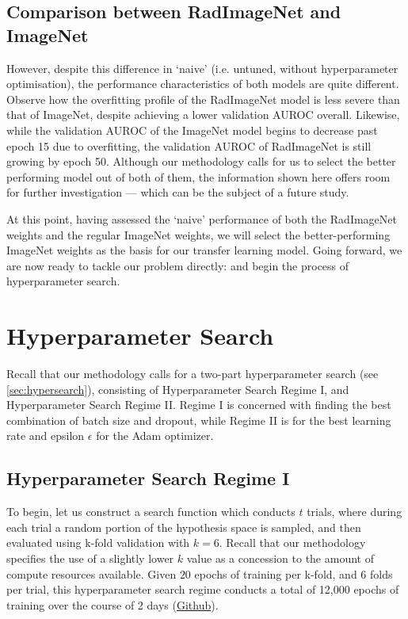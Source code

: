 \subsection{Comparison between RadImageNet and ImageNet}

However, despite this difference in \enquote*{naive} (i.e. untuned, without hyperparameter optimisation), the performance characteristics of both models are quite different. Observe how the overfitting profile of the RadImageNet model is less severe than that of ImageNet, despite achieving a lower validation AUROC overall. Likewise, while the validation AUROC of the ImageNet model begins to decrease past epoch 15 due to overfitting, the validation AUROC of RadImageNet is still growing by epoch 50. Although our methodology calls for us to select the better performing model out of both of them, the information shown here offers room for further investigation --- which can be the subject of a future study.

At this point, having assessed the \enquote*{naive} performance of both the RadImageNet weights and the regular ImageNet weights, we will select the better-performing ImageNet weights as the basis for our transfer learning model. Going forward, we are now ready to tackle our problem directly: and begin the process of hyperparameter search.

\section{Hyperparameter Search}

Recall that our methodology calls for a two-part hyperparameter search (see \autoref{sec:hypersearch}), consisting of Hyperparameter Search Regime I, and Hyperparameter Search Regime II. Regime I is concerned with finding the best combination of batch size and dropout, while Regime II is for the best learning rate and epsilon \(\epsilon\) for the Adam optimizer.

\subsection{Hyperparameter Search Regime I}

To begin, let us construct a search function which conducts \(t\) trials, where during each trial a random portion of the hypothesis space is sampled, and then evaluated using k-fold validation with \(k = 6\). Recall that our methodology specifies the use of a slightly lower \(k\) value as a concession to the amount of compute resources available. Given \(20\) epochs of training per k-fold, and \(6\) folds per trial, this hyperparameter search regime conducts a total of 12,000 epochs of training over the course of 2 days (\href{https://github.com/ShenZhouHong/radiography-ai-project/blob/master/python/hyperparam-search/regime-1.ipynb}{Github}).

